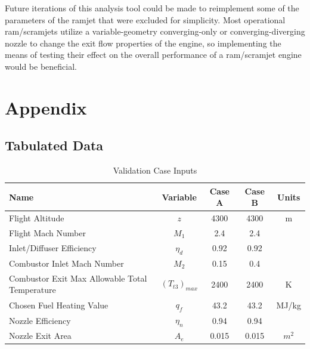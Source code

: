 \documentclass[conf]{new-aiaa} %
\begin{document}
Future iterations of this analysis tool could be made to reimplement some of the parameters of the ramjet that were excluded for simplicity. Most operational ram/scramjets utilize a variable-geometry converging-only or converging-diverging nozzle to change the exit flow properties of the engine, so implementing the means of testing their effect on the overall performance of a ram/scramjet engine would be beneficial.


\section*{Appendix}
\subsection{Tabulated Data}
\begin{table}[H] %
    \caption{\label{tab:val_case_input}Validation Case Inputs}
    \centering
    \begin{tabular}{lcccc}
        \hline
        Name& Variable& Case A& Case B& Units\\\hline
        Flight Altitude& $z$& 4300& 4300& m\\
        Flight Mach Number& $M_1$& 2.4& 2.4\\
        Inlet/Diffuser Efficiency& $\eta_d$& 0.92& 0.92\\
        Combustor Inlet Mach Number& $M_2$& 0.15& 0.4\\
        Combustor Exit Max Allowable Total Temperature& $(T_{t3})_{max}$& 2400& 2400& K\\
        Chosen Fuel Heating Value& $q_f$& 43.2& 43.2& MJ/kg\\
        Nozzle Efficiency& $\eta_n$& 0.94& 0.94\\
        Nozzle Exit Area& $A_e$& 0.015& 0.015& $m^2$\\
        \hline
    \end{tabular}
\end{table}
\end{document}

